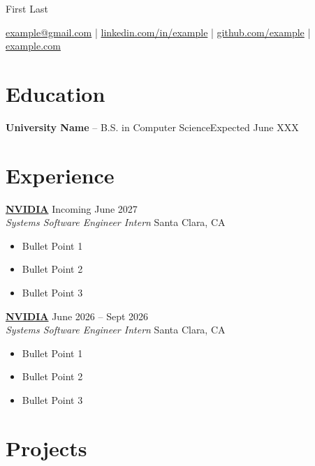 \documentclass[11pt]{article}
\begin{document}

\centerline{\Huge First Last}
\vspace{5pt}
\centerline{\href{mailto:example@gmail.com}{example@gmail.com} | \href{https://www.linkedin.com/in/example}{linkedin.com/in/example} | \href{https://github.com/example}{github.com/example} | \href{https://example.com}{example.com}}
\vspace{-10pt}


\section*{Education}
\textbf{University Name} -- B.S. in Computer Science\hfill Expected June XXX
\vspace{-10pt}


\section*{Experience}

\textbf{\href{https://www.nvidia.com/en-us/}{NVIDIA}} \hfill Incoming June 2027 \\
\textit{Systems Software Engineer Intern} \hfill Santa Clara, CA \\
\vspace{-9pt}
\begin{itemize}
  \item Bullet Point 1
  \item Bullet Point 2
  \item Bullet Point 3
\end{itemize}

\textbf{\href{https://www.nvidia.com/en-us/}{NVIDIA}} \hfill June 2026 -- Sept 2026 \\
\textit{Systems Software Engineer Intern} \hfill Santa Clara, CA \\
\vspace{-9pt}
\begin{itemize}
  \item Bullet Point 1
  \item Bullet Point 2
  \item Bullet Point 3
\end{itemize}

\vspace{-18.5pt}


\section*{Projects}
\end{document}
